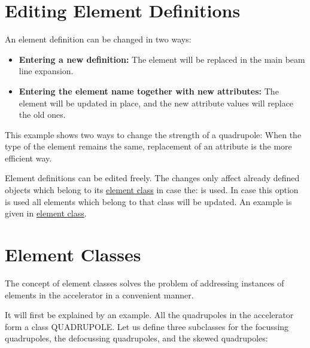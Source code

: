 %
\section{Editing Element Definitions}  
\label{sec:element-editing}

An element definition can be changed in two ways: 
\begin{itemize}
   \item \textbf{Entering a new definition:} The element will be
     replaced in the main beam line expansion.  
   \item \textbf{Entering the element name together with new
     attributes:} The element will be updated in place, and the new
     attribute values will replace the old ones.  
\end{itemize} 

This example shows two ways to change the strength of a quadrupole: 
When the type of the element remains the same, replacement of an
attribute is the more efficient way.  

Element definitions can be edited freely. The changes only affect
already defined objects which belong to its
\hyperref[sec:element-classes]{element class} in case the:  is used.
In case this option is used all elements which belong to that class will be updated. 
An example is given in \hyperref[sec:element-classes]{element class}.   


%
\section{Element Classes}  
\label{sec:element-classes}
The concept of element classes solves the problem of addressing
instances of elements in the accelerator in a convenient manner. 

It will first be explained by an example. All the quadrupoles in the
accelerator form a class QUADRUPOLE. Let us define three subclasses for the
focussing quadrupoles, the defocussing quadrupoles, and the skewed
quadrupoles:  

